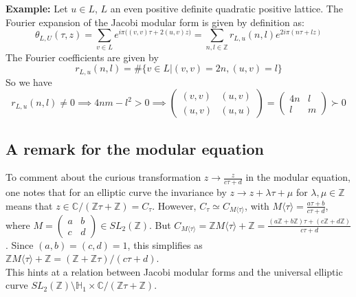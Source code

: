 \documentclass[10pt,a4paper]{article}
\begin{document}
\textbf{Example:} Let $u\in L$, $L$ an even positive definite quadratic positive lattice. The Fourier expansion of the Jacobi modular form is given by definition as:
\[\theta_{L,U}(\tau,z)=\sum_{v\in L}e^{i\pi\big((v,v)\tau+2(u,v)z\big)}=\sum_{n,l\in\mathbb{Z}}r_{L,u}(n,l)e^{2i\pi(n\tau+lz)}\]
The Fourier coefficients are given by
\[r_{L,u}(n,l)=\#\{v\in L|(v,v)=2n,(u,v)=l\}\]
So we have
\[r_{L,u}(n,l)\neq0\implies4nm-l^2>0\implies\left(\begin{array}{cc}(v,v)&(u,v)\\(u,v)&(u,u)\end{array}\right)=\left(\begin{array}{cc}4n&l\\l&m\end{array}\right)\succ0\]
\subsection{A remark for the modular equation}
To comment about the curious transformation $z\rightarrow\frac{z}{c\tau+d}$ in the modular equation, one notes that for an elliptic curve the invariance by $z\rightarrow z+\lambda\tau+\mu$ for $\lambda, \mu\in\mathbb{Z}$ means that $z\in\mathbb{C}/(\mathbb{Z}\tau+\mathbb{Z})=C_\tau$. However, $C_\tau\simeq C_{M\langle\tau\rangle}$, with $M\langle\tau\rangle=\frac{a\tau+b}{c\tau+d}$, where $M=\left(\begin{array}{cc}a&b\\c&d\end{array}\right)\in SL_2(\mathbb{Z})$. But $C_{M\langle\tau\rangle}=\mathbb{Z}M\langle\tau\rangle+\mathbb{Z}=
\frac{(a\mathbb{Z}+b\mathbb{Z})\tau+(c\mathbb{Z}+d\mathbb{Z})}{c\tau+d}$. Since $(a,b)=(c,d)=1$, this simplifies as $\mathbb{Z}M\langle\tau\rangle+\mathbb{Z}=(\mathbb{Z}
+\mathbb{Z}\tau)/(c\tau+d)$.\\
This hints at a relation between Jacobi modular forms and the universal elliptic curve $SL_2(\mathbb{Z})\setminus\mathbb{H}_1\times\mathbb{C}/	(\mathbb{Z}\tau+\mathbb{Z})$.
\end{document}
